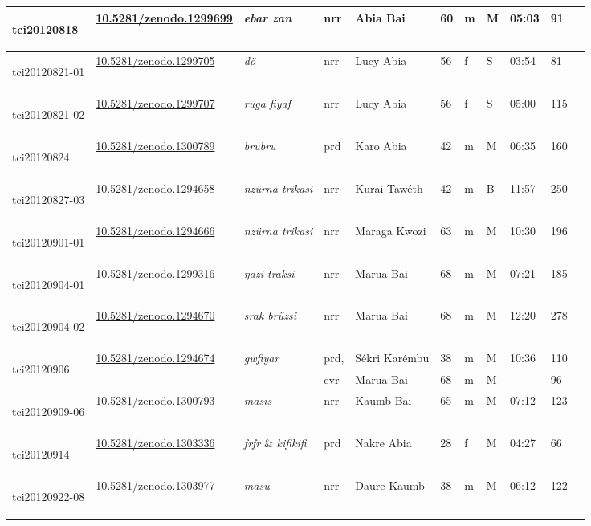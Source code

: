 \begin{landscape}
{\begin{longtable}{p{}llllllllll}
	\hypertarget{tci20120818}{tci20120818} &\href{https://zenodo.org/record/1299699}{10.5281/zenodo.1299699}& \emph{ebar zan} & nrr & Abia Bai & 60 & m & M & 05:03 & 91\\\hline
	\hypertarget{tci20120821-01}{tci20120821-01} &\href{https://zenodo.org/record/1299705}{10.5281/zenodo.1299705}& \emph{dö} & nrr & Lucy Abia & 56 & f & S & 03:54 & 81\\\hline
	\hypertarget{tci20120821-02}{tci20120821-02} &\href{https://zenodo.org/record/1299707}{10.5281/zenodo.1299707}& \emph{ruga fiyaf} & nrr & Lucy Abia & 56 & f & S & 05:00 & 115\\\hline
	\hypertarget{tci20120824}{tci20120824} &\href{https://zenodo.org/record/1300789}{10.5281/zenodo.1300789}& \emph{brubru} & prd & Karo Abia & 42 & m & M & 06:35 & 160\\\hline
	\hypertarget{tci20120827-03}{tci20120827-03} &\href{https://zenodo.org/record/1294658}{10.5281/zenodo.1294658}& \emph{nzürna trikasi} & nrr & Kurai Tawéth & 42 & m & B & 11:57 & 250\\\hline
	\hypertarget{tci20120901-01}{tci20120901-01} &\href{https://zenodo.org/record/1294666}{10.5281/zenodo.1294666}& \emph{nzürna trikasi} & nrr & Maraga Kwozi & 63 & m & M & 10:30 & 196\\\hline
	\hypertarget{tci20120904-01}{tci20120904-01} &\href{https://zenodo.org/record/1299316}{10.5281/zenodo.1299316}& \emph{ŋazi traksi} & nrr & Marua Bai & 68 & m & M & 07:21 & 185\\\hline
	\hypertarget{tci20120904-02}{tci20120904-02} &\href{https://zenodo.org/record/1294670}{10.5281/zenodo.1294670}& \emph{srak brüzsi} & nrr & Marua Bai & 68 & m & M & 12:20 & 278\\\hline
	\multirow{2}{*}{\hypertarget{tci20120906}{tci20120906}} &\multirow{2}{*}{\href{https://zenodo.org/record/1294674}{10.5281/zenodo.1294674}}& \multirow{2}{*}{\emph{gwfiyar}} &prd, & Sékri Karémbu & 38 & m & M & \multirow{2}{*}{10:36} & 110\\
	&&&cvr& Marua Bai & 68 & m & M & &96\\\hline
	\hypertarget{tci20120909-06}{tci20120909-06} &\href{https://zenodo.org/record/1300793}{10.5281/zenodo.1300793}& \emph{masis} & nrr & Kaumb Bai & 65 & m & M & 07:12 & 123\\\hline
	\hypertarget{tci20120914}{tci20120914} &\href{https://zenodo.org/record/1303336}{10.5281/zenodo.1303336}& \emph{frfr} \& \emph{kifikifi} & prd & Nakre Abia & 28 & f & M & 04:27 & 66\\\hline
	\hypertarget{tci20120922-08}{tci20120922-08} &\href{https://zenodo.org/record/1303977}{10.5281/zenodo.1303977}& \emph{masu} & nrr & Daure Kaumb & 38 & m & M & 06:12 & 122\\\hline

\end{longtable}}
\end{landscape}
